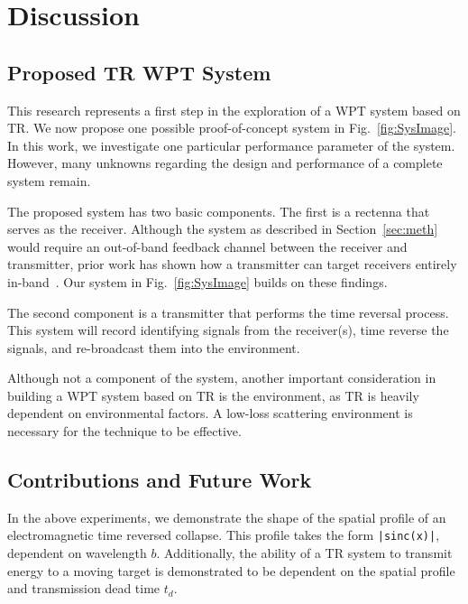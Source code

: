 \section{Discussion}
\label{sec:discussion}

\subsection{Proposed TR WPT System}
\label{sec:system}

This research represents a first step in the exploration of a WPT system based on TR. We now propose one possible proof-of-concept system in Fig.~\ref{fig:SysImage}. In this work, we investigate one particular performance parameter of the system. However, many unknowns regarding the design and performance of a complete system remain.

The proposed system has two basic components. The first is a rectenna that serves as the receiver. Although the system as described in Section~\ref{sec:meth} would require an out-of-band feedback channel between the receiver and transmitter, prior work has shown how a transmitter can target  receivers entirely in-band~\cite{nltr-wave-chaotic,roman}. Our system in Fig.~\ref{fig:SysImage} builds on these findings.

The second component is a transmitter that performs the time reversal process. This system will record identifying signals from the receiver(s), time reverse the signals, and re-broadcast them into the environment.

Although not a component of the system, another important consideration in building a WPT system based on TR is the environment, as TR is heavily dependent on environmental factors. A low-loss scattering environment is necessary for the technique to be effective.

\subsection{Contributions and Future Work}
\label{sec:contrib}

In the above experiments, we demonstrate the shape of the spatial profile of an electromagnetic
time reversed collapse. This profile takes the form \texttt{|sinc(x)|}, dependent on wavelength $b$.
Additionally, the ability of a TR system to transmit energy to a moving target is
demonstrated to be dependent on the spatial profile and transmission dead
time $t_{d}$.

